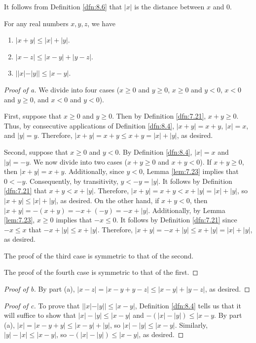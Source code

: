 \documentclass[../main.tex]{subfiles}
\begin{document}
\begin{remark}\label{rmk:8.7}
    It follows from Definition \ref{dfn:8.6} that $|x|$ is the distance between $x$ and $0$.
\end{remark}

\begin{lemma}\label{lem:8.8}
    For any real numbers $x,y,z$, we have
    \begin{enumerate}[label={\textup{(}\alph*\textup{)}}]
        \item $|x+y|\leq|x|+|y|$.
        \item $|x-z|\leq|x-y|+|y-z|$.
        \item $||x|-|y||\leq|x-y|$.
    \end{enumerate}
    \begin{proof}[Proof of a]
        We divide into four cases ($x\geq 0$ and $y\geq 0$, $x\geq 0$ and $y<0$, $x<0$ and $y\geq 0$, and $x<0$ and $y<0$).\par
        First, suppose that $x\geq 0$ and $y\geq 0$. Then by Definition \ref{dfn:7.21}, $x+y\geq 0$. Thus, by consecutive applications of Definition \ref{dfn:8.4}, $|x+y|=x+y$, $|x|=x$, and $|y|=y$. Therefore, $|x+y|=x+y\leq x+y=|x|+|y|$, as desired.\par
        Second, suppose that $x\geq 0$ and $y<0$. By Definition \ref{dfn:8.4}, $|x|=x$ and $|y|=-y$. We now divide into two cases ($x+y\geq 0$ and $x+y<0$). If $x+y\geq 0$, then $|x+y|=x+y$. Additionally, since $y<0$, Lemma \ref{lem:7.23} implies that $0<-y$. Consequently, by transitivity, $y<-y=|y|$. It follows by Definition \ref{dfn:7.21} that $x+y<x+|y|$. Therefore, $|x+y|=x+y<x+|y|=|x|+|y|$, so $|x+y|\leq|x|+|y|$, as desired. On the other hand, if $x+y<0$, then $|x+y|=-(x+y)=-x+(-y)=-x+|y|$. Additionally, by Lemma \ref{lem:7.23}, $x\geq 0$ implies that $-x\leq 0$. It follows by Definition \ref{dfn:7.21} since $-x\leq x$ that $-x+|y|\leq x+|y|$. Therefore, $|x+y|=-x+|y|\leq x+|y|=|x|+|y|$, as desired.\par
        The proof of the third case is symmetric to that of the second.\par
        The proof of the fourth case is symmetric to that of the first.
    \end{proof}
    \begin{proof}[Proof of b]
        By part (a), $|x-z|=|x-y+y-z|\leq |x-y|+|y-z|$, as desired.
    \end{proof}
    \begin{proof}[Proof of c]
        To prove that $||x|-|y||\leq|x-y|$, Definition \ref{dfn:8.4} tells us that it will suffice to show that $|x|-|y|\leq|x-y|$ and $-(|x|-|y|)\leq|x-y$. By part (a), $|x|=|x-y+y|\leq|x-y|+|y|$, so $|x|-|y|\leq|x-y|$. Similarly, $|y|-|x|\leq|x-y|$, so $-(|x|-|y|)\leq|x-y|$, as desired.
    \end{proof}
\end{lemma}
\end{document}
